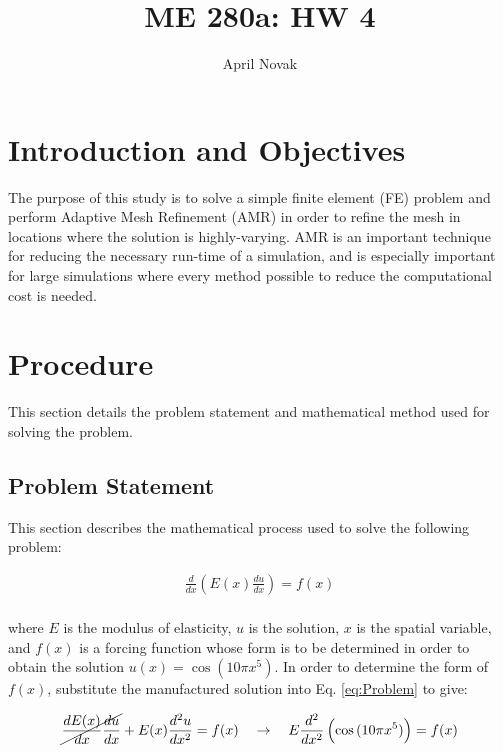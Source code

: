 \documentclass[10pt]{article}
\begin{document}
\title{ME 280a: HW 4}
\author{April Novak}

\maketitle

\section{Introduction and Objectives}

The purpose of this study is to solve a simple finite element (FE) problem and perform Adaptive Mesh Refinement (AMR) in order to refine the mesh in locations where the solution is highly-varying. AMR is an important technique for reducing the necessary run-time of a simulation, and is especially important for large simulations where every method possible to reduce the computational cost is needed.

\section{Procedure}
\label{sec:Procedure}

This section details the problem statement and mathematical method used for solving the problem.

\subsection{Problem Statement}

This section describes the mathematical process used to solve the following problem:

\begin{equation}
\label{eq:Problem}
\begin{aligned}
\frac{d}{dx}\left(E(x)\frac{du}{dx}\right)=f(x)\\
\end{aligned}
\end{equation}

where \(E\) is the modulus of elasticity, \(u\) is the solution, \(x\) is the spatial variable, and \(f(x)\) is a forcing function whose form is to be determined in order to obtain the solution \(u(x)=\cos{(10\pi x^5)}\). In order to determine the form of \(f(x)\), substitute the manufactured solution into Eq. \eqref{eq:Problem} to give:

\begin{equation}
\label{eq:Problem2}
\cancel{\frac{dE(x)}{dx}\frac{du}{dx}}+E(x)\frac{d^2u}{dx^2}=f(x)\quad\rightarrow\quad E\frac{d^2}{dx^2}\left(\cos{(10\pi x^5)}\right)=f(x)
\end{equation}
\end{document}
